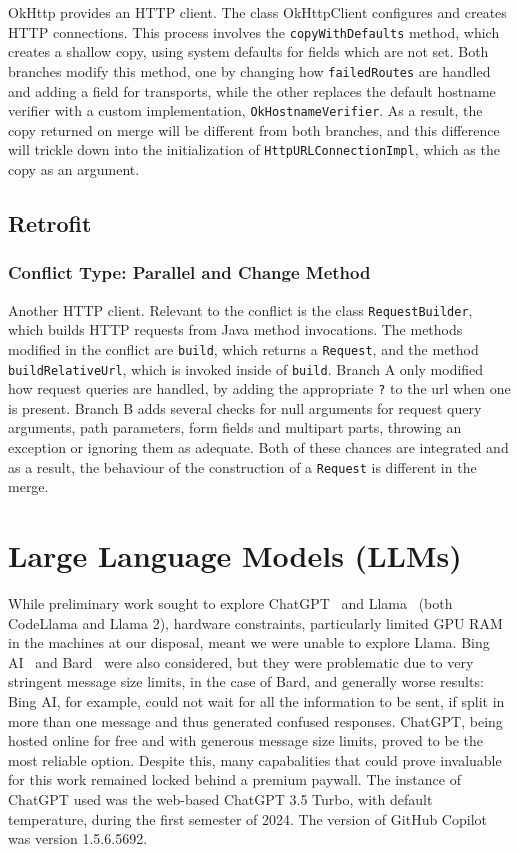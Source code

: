 OkHttp provides an HTTP client. The class OkHttpClient configures and creates HTTP connections. This process involves
the \texttt{copyWithDefaults} method, which creates a shallow copy, using system defaults for fields which are not set. Both branches
modify this method, one by changing how \texttt{failedRoutes} are handled and adding a field for transports, while the other replaces
the default hostname verifier with a custom implementation, \texttt{OkHostnameVerifier}. As a result, the copy returned on merge will
be different from both branches, and this difference will trickle down into the initialization of \texttt{HttpURLConnectionImpl}, which
as the copy as an argument.

\subsection{Retrofit}

\subsubsection{Conflict Type: Parallel and Change Method}

Another HTTP client. Relevant to the conflict is the class \texttt{RequestBuilder}, which builds HTTP requests from Java method invocations. The methods modified
in the conflict are \texttt{build}, which returns a \texttt{Request}, and the method \texttt{buildRelativeUrl}, which is invoked inside of \texttt{build}.
Branch A only modified how request queries are handled, by adding the appropriate \texttt{?} to the url when one is present.
Branch B adds several checks for null arguments for request query arguments, path parameters, form fields and multipart parts, throwing an exception or ignoring them as adequate.
Both of these chances are integrated and as a result, the behaviour of the construction of a \texttt{Request} is different in the merge.

\section{Large Language Models (LLMs)}

While preliminary work sought to explore ChatGPT~\cite{kn:gpt} and Llama~\cite{kn:llama} (both CodeLlama and Llama 2), hardware constraints, particularly limited GPU RAM in the machines at our disposal, meant we were unable to explore Llama.  Bing AI~\cite{kn:bingAI} and Bard~\cite{kn:bard} were also considered, but they were problematic due to very stringent message size limits, in the case of Bard, and generally worse results: Bing AI, for example, could not wait for all the information to be sent, if split in more than one message and thus generated confused responses. ChatGPT, being hosted online for free and with generous message size limits, proved to be the most reliable option. Despite this, many capabalities that could prove invaluable for this work remained locked behind a premium paywall.
The instance of ChatGPT used was the web-based ChatGPT 3.5 Turbo, with default temperature, during the first semester of 2024.
The version of GitHub Copilot was version 1.5.6.5692.

